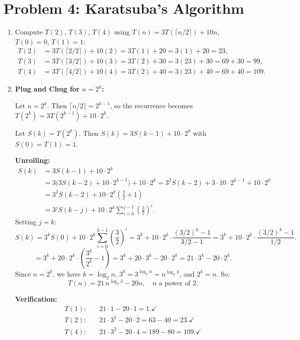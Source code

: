 \documentclass[11pt]{article}
\begin{document}
\section*{Problem 4: Karatsuba's Algorithm}
\begin{enumerate}[label=\textbf{(\alph*)}]

\item Compute $T(2)$, $T(3)$, $T(4)$ using $T(n) = 3T(\lceil n/2 \rceil) + 10n$, $T(0)=0$, $T(1)=1$:
\begin{align*}
  T(2) &= 3T(\lceil 2/2 \rceil) + 10(2) = 3T(1) + 20 = 3(1)+20 = 23,\\
  T(3) &= 3T(\lceil 3/2 \rceil) + 10(3) = 3T(2) + 30 = 3(23)+30 = 69+30 = 99,\\
  T(4) &= 3T(\lceil 4/2 \rceil) + 10(4) = 3T(2) + 40 = 3(23)+40 = 69+40 = 109.
\end{align*}

\item \textbf{Plug and Chug for $n = 2^k$:}

Let $n = 2^k$. Then $\lceil n/2 \rceil = 2^{k-1}$, so the recurrence becomes $T(2^k) = 3T(2^{k-1}) + 10\cdot 2^k$.

Let $S(k) = T(2^k)$. Then $S(k) = 3S(k-1) + 10\cdot 2^k$ with $S(0) = T(1) = 1$.

\textbf{Unrolling:}
\begin{align*}
  S(k) &= 3S(k-1) + 10\cdot 2^k\\
       &= 3\bigl(3S(k-2) + 10\cdot 2^{k-1}\bigr) + 10\cdot 2^k = 3^2 S(k-2) + 3\cdot 10\cdot 2^{k-1} + 10\cdot 2^k\\
       &= 3^2 S(k-2) + 10\cdot 2^k\!\left(\frac{3}{2} + 1\right)\\
       &= 3^j S(k-j) + 10\cdot 2^k \sum_{i=0}^{j-1}\left(\frac{3}{2}\right)^i.
\end{align*}
Setting $j = k$:
\[
  S(k) = 3^k S(0) + 10\cdot 2^k \sum_{i=0}^{k-1}\left(\frac{3}{2}\right)^i = 3^k + 10\cdot 2^k\cdot\frac{(3/2)^k - 1}{3/2 - 1} = 3^k + 10\cdot 2^k\cdot\frac{(3/2)^k-1}{1/2}.
\]
\[
  = 3^k + 20\cdot 2^k\cdot\left(\frac{3^k}{2^k} - 1\right) = 3^k + 20\cdot 3^k - 20\cdot 2^k = 21\cdot 3^k - 20\cdot 2^k.
\]
Since $n = 2^k$, we have $k = \log_2 n$, $3^k = 3^{\log_2 n} = n^{\log_2 3}$, and $2^k = n$. So:
\[
  \boxed{T(n) = 21\,n^{\log_2 3} - 20n, \quad n \text{ a power of } 2.}
\]

\textbf{Verification:}
\begin{align*}
  T(1):&\quad 21\cdot 1 - 20\cdot 1 = 1.\checkmark\\
  T(2):&\quad 21\cdot 3^1 - 20\cdot 2 = 63 - 40 = 23.\checkmark\\
  T(4):&\quad 21\cdot 3^2 - 20\cdot 4 = 189 - 80 = 109.\checkmark
\end{align*}


\end{enumerate}
\end{document}
